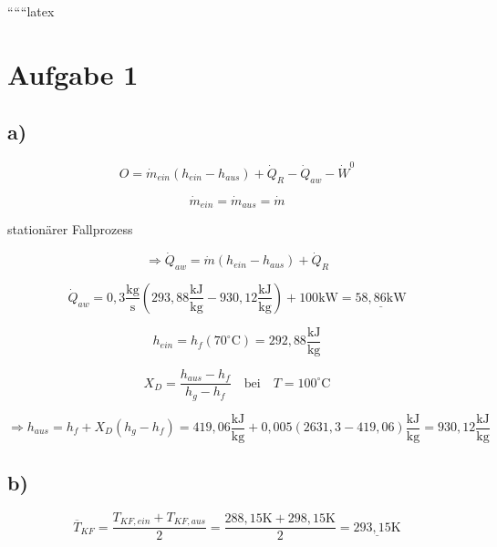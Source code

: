 
``````latex


\section*{Aufgabe 1}

\subsection*{a)}

\begin{equation*}
O = \dot{m}_{ein} (h_{ein} - h_{aus}) + \dot{Q}_R - \dot{Q}_{aw} - \dot{W}^0
\end{equation*}

\begin{equation*}
\dot{m}_{ein} = \dot{m}_{aus} = \dot{m}
\end{equation*}

stationärer Fallprozess

\begin{equation*}
\Rightarrow \dot{Q}_{aw} = \dot{m} (h_{ein} - h_{aus}) + \dot{Q}_R
\end{equation*}

\begin{equation*}
\dot{Q}_{aw} = 0,3 \frac{\text{kg}}{\text{s}} (293,88 \frac{\text{kJ}}{\text{kg}} - 930,12 \frac{\text{kJ}}{\text{kg}}) + 100 \text{kW} = \underline{58,86 \text{kW}}
\end{equation*}

\begin{equation*}
h_{ein} = h_f \left( 70^\circ \text{C} \right) = 292,88 \frac{\text{kJ}}{\text{kg}}
\end{equation*}

\begin{equation*}
X_D = \frac{h_{aus} - h_f}{h_g - h_f} \quad \text{bei} \quad T = 100^\circ \text{C}
\end{equation*}

\begin{equation*}
\Rightarrow h_{aus} = h_f + X_D (h_g - h_f) = 419,06 \frac{\text{kJ}}{\text{kg}} + 0,005 (2631,3 - 419,06) \frac{\text{kJ}}{\text{kg}} = 930,12 \frac{\text{kJ}}{\text{kg}}
\end{equation*}

\subsection*{b)}

\begin{equation*}
\overline{T}_{KF} = \frac{T_{KF,ein} + T_{KF,aus}}{2} = \frac{288,15 \text{K} + 298,15 \text{K}}{2} = \underline{293,15 \text{K}}
\end{equation*}

